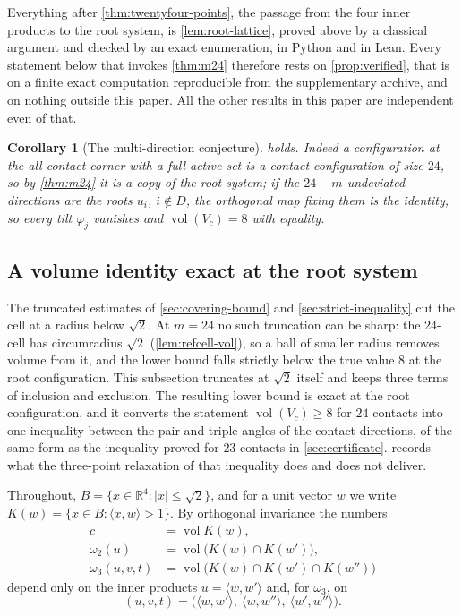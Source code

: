 \documentclass[11pt,reqno]{amsart}
\renewcommand{\_}{\origunderscore\allowbreak}
\numberwithin{equation}{section}
\theoremstyle{plain}
\newtheorem{cor}[thm]{Corollary}
\theoremstyle{definition}
\theoremstyle{remark}
\newcommand{\tilt}{\varphi}                  %
\newcommand{\base}{u}                        %
\DeclareMathOperator{\vol}{vol}
\begin{document}
Everything after \cref{thm:twentyfour-points}, the passage from the four
inner products to the root system, is \cref{lem:root-lattice}, proved
above by a classical argument and checked by an exact enumeration, in
Python and in Lean. Every
statement below that invokes \cref{thm:m24} therefore rests on
\cref{prop:verified}, that is on a finite exact computation reproducible
from the supplementary archive, and on nothing outside this paper. All
the other results in this paper are independent even of that.

\begin{cor}[The multi-direction conjecture]\label{cor:conj-resolved}
 holds. Indeed a configuration at the
all-contact corner with a full active set is a contact configuration of
size $24$, so by \cref{thm:m24} it is a copy of the root system; if the
$24-m$ undeviated directions are the roots $\base_i$, $i\notin D$, the
orthogonal map fixing them is the identity, so every tilt $\tilt_j$
vanishes and $\vol(V_c)=8$ with equality.
\end{cor}

\subsection{A volume identity exact at the root system}\label{sec:m24-volume}

The truncated estimates of \cref{sec:covering-bound} and
\cref{sec:strict-inequality} cut the cell at a radius below $\sqrt2$.
At $m=24$ no such truncation can be sharp: the $24$-cell has
circumradius $\sqrt2$ (\cref{lem:refcell-vol}), so a ball of smaller
radius removes volume from it, and the lower bound falls strictly below
the true value $8$ at the root configuration. This subsection truncates
at $\sqrt2$ itself and keeps three terms of inclusion and exclusion. The
resulting lower bound is exact at the root configuration, and it
converts the statement $\vol(V_c)\ge8$ for $24$ contacts into one
inequality between the pair and triple angles of the contact
directions, of the same form as the inequality proved for $23$ contacts
in \cref{sec:certificate}.  records what the
three-point relaxation of that inequality does and does not deliver.

Throughout, $B=\{x\in\mathbb{R}^4:|x|\le\sqrt2\}$, and for a unit vector
$w$ we write $K(w)=\{x\in B:\langle x,w\rangle>1\}$. By orthogonal
invariance the numbers
\begin{align*}
  c&=\vol K(w),\\
  \omega_2(u)&=\vol\bigl(K(w)\cap K(w')\bigr),\\
  \omega_3(u,v,t)&=\vol\bigl(K(w)\cap K(w')\cap K(w'')\bigr)
\end{align*}
depend only on the inner products $u=\langle w,w'\rangle$ and, for
$\omega_3$, on
\[
  (u,v,t)=\bigl(\langle w,w'\rangle,\ \langle w,w''\rangle,\
  \langle w',w''\rangle\bigr).
\]
\end{document}
